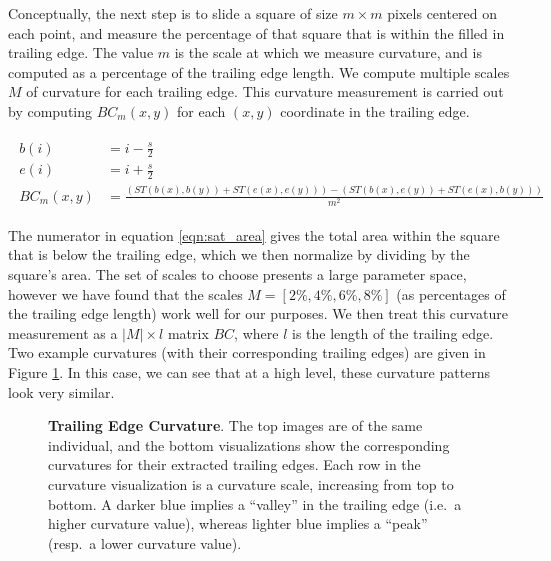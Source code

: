 Conceptually, the next step is to slide a square of size $m \times m$ pixels centered on each point, and measure the percentage of that square that is within the filled in trailing edge.
The value $m$ is the scale at which we measure curvature, and is computed as a percentage of the trailing edge length.
We compute multiple scales $M$ of curvature for each trailing edge.
This curvature measurement is carried out by computing $BC_m(x, y)$ for each $(x, y)$ coordinate in the trailing edge.

\begin{align} \label{eqn:sat_area}
\begin{split}
b(i) &= i - \frac{s}{2}\\
e(i) &= i + \frac{s}{2}\\
BC_m(x,y) &= \frac{(ST(b(x), b(y)) + ST(e(x), e(y))) - (ST(b(x), e(y)) + ST(e(x), b(y)))}{m^2}
\end{split}
\end{align}

The numerator in equation \eqref{eqn:sat_area} gives the total area within the square that is below the trailing edge, which we then normalize by dividing by the square's area.
The set of scales to choose presents a large parameter space, however we have found that the scales $M = [2\%, 4\%, 6\%, 8\%]$ (as percentages of the trailing edge length) work well for our purposes.
We then treat this curvature measurement as a $|M| \times l$ matrix $BC$, where $l$ is the length of the trailing edge.
Two example curvatures (with their corresponding trailing edges) are given in Figure \ref{fig:example_curv}.
In this case, we can see that at a high level, these curvature patterns look very similar.

\begin{figure}[t]%
\centering
{}
\newline
{}
\caption{\textbf{Trailing Edge Curvature}. The top images are of the same individual, and the bottom visualizations show the corresponding curvatures for their extracted trailing edges. Each row in the curvature visualization is a curvature scale, increasing from top to bottom. A darker blue implies a ``valley'' in the trailing edge (i.e.\ a higher curvature value), whereas lighter blue implies a ``peak'' (resp.\ a lower curvature value).}
\label{fig:example_curv}
\end{figure}

